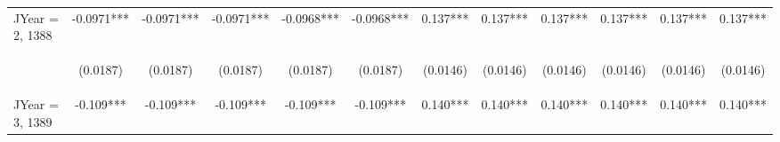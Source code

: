 \documentclass[]{article}
\begin{document}
\begin{center}
\begin{tabular}{lccccccccccc}
JYear = 2, 1388 & -0.0971*** & -0.0971*** & -0.0971*** & -0.0968*** & -0.0968*** & 0.137*** & 0.137*** & 0.137*** & 0.137*** & 0.137*** & 0.137*** \\
\vspace{4pt} & \begin{footnotesize}(0.0187)\end{footnotesize} & \begin{footnotesize}(0.0187)\end{footnotesize} & \begin{footnotesize}(0.0187)\end{footnotesize} & \begin{footnotesize}(0.0187)\end{footnotesize} & \begin{footnotesize}(0.0187)\end{footnotesize} & \begin{footnotesize}(0.0146)\end{footnotesize} & \begin{footnotesize}(0.0146)\end{footnotesize} & \begin{footnotesize}(0.0146)\end{footnotesize} & \begin{footnotesize}(0.0146)\end{footnotesize} & \begin{footnotesize}(0.0146)\end{footnotesize} & \begin{footnotesize}(0.0146)\end{footnotesize} \\
JYear = 3, 1389 & -0.109*** & -0.109*** & -0.109*** & -0.109*** & -0.109*** & 0.140*** & 0.140*** & 0.140*** & 0.140*** & 0.140*** & 0.140*** \\

\end{tabular}
\end{center}
\end{document}
